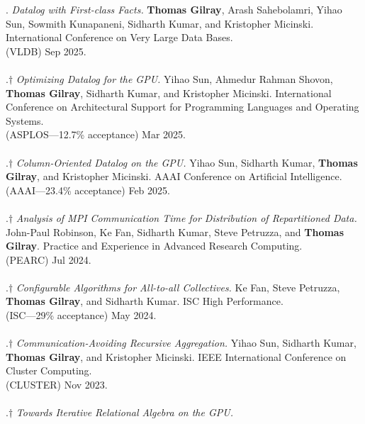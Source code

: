 \paper. \textit{Datalog with First-class Facts.}
\textbf{Thomas Gilray}, Arash Sahebolamri, Yihao Sun, Sowmith Kunapaneni, Sidharth Kumar, and Kristopher Micinski.
International Conference on Very Large Data Bases.
\\(VLDB) Sep 2025. 
\\ \vspace{-0.1cm}\\
\paper.$\dagger$ \textit{Optimizing Datalog for the GPU.}
Yihao Sun, Ahmedur Rahman Shovon, \textbf{Thomas Gilray}, Sidharth Kumar, and Kristopher Micinski.
International Conference on Architectural Support for Programming Languages and Operating Systems.
\\(ASPLOS---12.7\% acceptance) Mar 2025. 
\\ \vspace{-0.1cm}\\
\paper.$\dagger$ \textit{Column-Oriented Datalog on the GPU.}
Yihao Sun, Sidharth Kumar, \textbf{Thomas Gilray}, and Kristopher Micinski.
AAAI Conference on Artificial Intelligence.
\\(AAAI---23.4\% acceptance) Feb 2025. 
\\ \vspace{-0.1cm}\\
\paper.$\dagger$ \textit{Analysis of MPI Communication Time for Distribution of Repartitioned Data.}
John-Paul Robinson, Ke Fan, Sidharth Kumar, Steve Petruzza, and \textbf{Thomas Gilray}.
Practice and Experience in Advanced Research Computing.
\\(PEARC) Jul 2024. 
\\ \vspace{-0.1cm}\\
\paper.$\dagger$ \textit{Configurable Algorithms for All-to-all Collectives.}
Ke Fan, Steve Petruzza, \textbf{Thomas Gilray}, and Sidharth Kumar.
ISC High Performance.
\\(ISC---29\% acceptance) May 2024. 
\\ \vspace{-0.1cm}\\
\paper.$\dagger$ \textit{Communication-Avoiding Recursive Aggregation.}
Yihao Sun, Sidharth Kumar, \textbf{Thomas Gilray}, and Kristopher Micinski.
IEEE International Conference on Cluster Computing.
\\(CLUSTER) Nov 2023. 
\\ \vspace{-0.1cm}\\
\paper.$\dagger$ \textit{Towards Iterative Relational Algebra on the GPU.}
